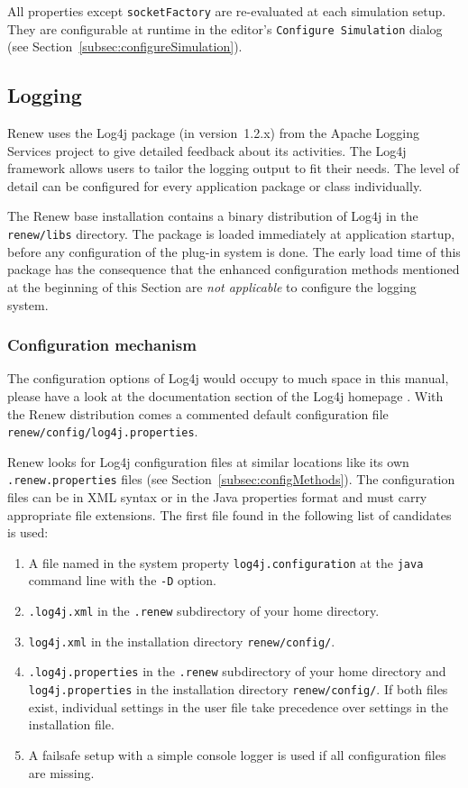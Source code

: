 All properties except \texttt{socketFactory} are re-evaluated at
each simulation setup.
They are configurable at runtime in the editor's \texttt{Configure
Simulation} dialog (see Section~\ref{subsec:configureSimulation}).

\subsection{Logging}
\label{subsec:log4jConfiguration}

Renew uses the Log4j package (in version~1.2.x) from the Apache
Logging Services project \cite{Log4j12} to give detailed feedback about
its activities.
The Log4j framework allows users to tailor the logging output to fit
their needs.
The level of detail can be configured for every application package or
class individually.%

The Renew base installation contains a binary distribution of Log4j in the
\texttt{renew\renewversion{}/libs} directory.  
The package is loaded immediately at application startup, before any
configuration of the plug-in system is done.
The early load time of this package has the consequence that the enhanced
configuration methods mentioned at the beginning of this Section are
\emph{not applicable} to configure the logging system.

\subsubsection{Configuration mechanism}
The configuration options of Log4j would occupy to much space in this
manual, please have a look at the documentation section of the Log4j
homepage \cite{Log4j12}.
With the Renew distribution comes a commented default configuration file
\texttt{renew\renewversion/config/log4j.properties}.

Renew looks for Log4j configuration files at similar locations like its own
\texttt{.renew.properties} files (see Section~\ref{subsec:configMethods}).
The configuration files can be in XML syntax or in the Java properties
format and must carry appropriate file extensions.
The first file found in the following list of candidates is used:
\begin{enumerate}
\item A file named in the system property \texttt{log4j.configuration} at
  the \texttt{java} command line with the \texttt{-D} option.
\item \texttt{.log4j.xml} in the \texttt{.renew} subdirectory of your home directory.
\item \texttt{log4j.xml} in the installation directory \texttt{renew\renewversion/config/}.
\item \texttt{.log4j.properties} in the \texttt{.renew} subdirectory of your home directory and
  \linebreak \texttt{log4j.properties} in the installation directory
  \texttt{renew\renewversion/config/}.  
  If both files exist, individual settings in the user file take precedence
  over settings in the installation file.
\item A failsafe setup with a simple console logger is used if all
  configuration files are missing.
\end{enumerate}

